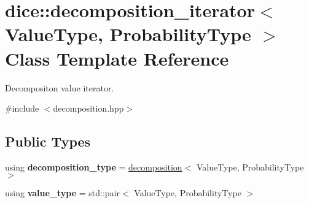 \hypertarget{classdice_1_1decomposition__iterator}{}\section{dice\+:\+:decomposition\+\_\+iterator$<$ Value\+Type, Probability\+Type $>$ Class Template Reference}
\label{classdice_1_1decomposition__iterator}


Decompositon value iterator.  




{\ttfamily \#include $<$decomposition.\+hpp$>$}

\subsection*{Public Types}
\begin{DoxyCompactItemize}
\item 
\mbox{\label{classdice_1_1decomposition__iterator_a1bd6ab0cacc2f5aebf8c2eb95ffb1075}} 
using {\bfseries decomposition\+\_\+type} = \mbox{\hyperlink{classdice_1_1decomposition}{decomposition}}$<$ Value\+Type, Probability\+Type $>$
\item 
\mbox{\label{classdice_1_1decomposition__iterator_a7570559737c46473e48a2dc2d4f1ba29}} 
using {\bfseries value\+\_\+type} = std\+::pair$<$ Value\+Type, Probability\+Type $>$
\end{DoxyCompactItemize}
